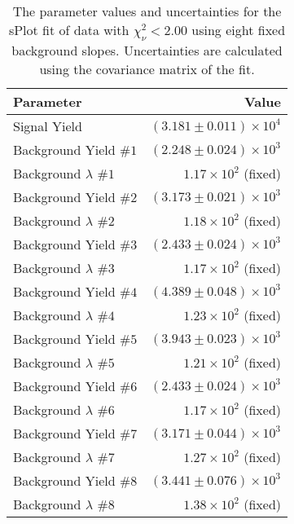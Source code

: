 
\begin{table}[ht]
    \begin{center}
        \begin{tabular}{lr}\toprule
            Parameter & Value \\\midrule
            Signal Yield & $(3.181 \pm 0.011) \times 10^{4}$ \\
            Background Yield $\#1$ & $(2.248 \pm 0.024) \times 10^{3}$ \\
            Background $\lambda$ $\#1$ & $1.17 \times 10^{2}$ (fixed) \\
            Background Yield $\#2$ & $(3.173 \pm 0.021) \times 10^{3}$ \\
            Background $\lambda$ $\#2$ & $1.18 \times 10^{2}$ (fixed) \\
            Background Yield $\#3$ & $(2.433 \pm 0.024) \times 10^{3}$ \\
            Background $\lambda$ $\#3$ & $1.17 \times 10^{2}$ (fixed) \\
            Background Yield $\#4$ & $(4.389 \pm 0.048) \times 10^{3}$ \\
            Background $\lambda$ $\#4$ & $1.23 \times 10^{2}$ (fixed) \\
            Background Yield $\#5$ & $(3.943 \pm 0.023) \times 10^{3}$ \\
            Background $\lambda$ $\#5$ & $1.21 \times 10^{2}$ (fixed) \\
            Background Yield $\#6$ & $(2.433 \pm 0.024) \times 10^{3}$ \\
            Background $\lambda$ $\#6$ & $1.17 \times 10^{2}$ (fixed) \\
            Background Yield $\#7$ & $(3.171 \pm 0.044) \times 10^{3}$ \\
            Background $\lambda$ $\#7$ & $1.27 \times 10^{2}$ (fixed) \\
            Background Yield $\#8$ & $(3.441 \pm 0.076) \times 10^{3}$ \\
            Background $\lambda$ $\#8$ & $1.38 \times 10^{2}$ (fixed) \\\bottomrule
        \end{tabular}
        \caption{The parameter values and uncertainties for the sPlot fit of data with $\chi^2_\nu < 2.00$ using eight fixed background slopes. Uncertainties are calculated using the covariance matrix of the fit.}\label{tab:splot-fit-results-chisqdof-2.00-fixed-8}
    \end{center}
\end{table}
